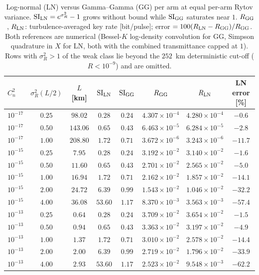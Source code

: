 \documentclass[11pt,a4paper]{article}
\theoremstyle{plain}
\theoremstyle{remark}
\begin{document}
\begin{table}[htbp]
\centering\small
\caption{Log-normal (LN) versus Gamma--Gamma (GG) per arm at equal per-arm Rytov variance. $\mathrm{SI}_{\rm LN}=e^{\sigma_R^2}-1$ grows without bound while $\mathrm{SI}_{\rm GG}$ saturates near $1$. $R_{\rm GG}$, $R_{\rm LN}$: turbulence-averaged key rate [bit/pulse]; error $=100(R_{\rm LN}-R_{\rm GG})/R_{\rm GG}$. Both references are numerical (Bessel-$K$ log-density convolution for GG, Simpson quadrature in $X$ for LN, both with the combined transmittance capped at $1$). Rows with $\sigma_R^2>1$ of the weak class lie beyond the $252$~km deterministic cut-off ($R<10^{-9}$) and are omitted.}
\label{tab:lnvsgg}
\begin{tabular}{lccccccc}
\toprule
$C_n^2$ & $\sigma_R^2(L/2)$ & $L$ [km] & $\mathrm{SI}_{\rm LN}$ & $\mathrm{SI}_{\rm GG}$ & $R_{\rm GG}$ & $R_{\rm LN}$ & LN error [\%]\\
\midrule
$10^{-17}$ & $0.25$ & $98.02$ & $0.28$ & $0.24$ & $4.307\times10^{-4}$ & $4.280\times10^{-4}$ & $-0.6$ \\
$10^{-17}$ & $0.50$ & $143.06$ & $0.65$ & $0.43$ & $6.463\times10^{-5}$ & $6.284\times10^{-5}$ & $-2.8$ \\
$10^{-17}$ & $1.00$ & $208.80$ & $1.72$ & $0.71$ & $3.672\times10^{-6}$ & $3.243\times10^{-6}$ & $-11.7$ \\
\midrule
$10^{-15}$ & $0.25$ & $7.95$ & $0.28$ & $0.24$ & $3.192\times10^{-2}$ & $3.140\times10^{-2}$ & $-1.6$ \\
$10^{-15}$ & $0.50$ & $11.60$ & $0.65$ & $0.43$ & $2.701\times10^{-2}$ & $2.565\times10^{-2}$ & $-5.0$ \\
$10^{-15}$ & $1.00$ & $16.94$ & $1.72$ & $0.71$ & $2.162\times10^{-2}$ & $1.857\times10^{-2}$ & $-14.1$ \\
$10^{-15}$ & $2.00$ & $24.72$ & $6.39$ & $0.99$ & $1.543\times10^{-2}$ & $1.046\times10^{-2}$ & $-32.2$ \\
$10^{-15}$ & $4.00$ & $36.08$ & $53.60$ & $1.17$ & $8.370\times10^{-3}$ & $3.563\times10^{-3}$ & $-57.4$ \\
\midrule
$10^{-13}$ & $0.25$ & $0.64$ & $0.28$ & $0.24$ & $3.709\times10^{-2}$ & $3.654\times10^{-2}$ & $-1.5$ \\
$10^{-13}$ & $0.50$ & $0.94$ & $0.65$ & $0.43$ & $3.363\times10^{-2}$ & $3.197\times10^{-2}$ & $-4.9$ \\
$10^{-13}$ & $1.00$ & $1.37$ & $1.72$ & $0.71$ & $3.010\times10^{-2}$ & $2.578\times10^{-2}$ & $-14.4$ \\
$10^{-13}$ & $2.00$ & $2.00$ & $6.39$ & $0.99$ & $2.719\times10^{-2}$ & $1.796\times10^{-2}$ & $-33.9$ \\
$10^{-13}$ & $4.00$ & $2.93$ & $53.60$ & $1.17$ & $2.523\times10^{-2}$ & $9.548\times10^{-3}$ & $-62.2$ \\

\bottomrule
\end{tabular}
\end{table}
\end{document}

